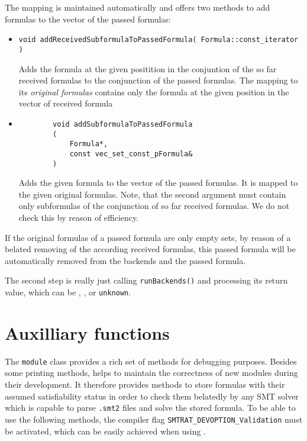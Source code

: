 The mapping is maintained automatically and offers two methods to add formulas to the vector
of the passed formulas:
\begin{itemize}
	\item \begin{verbatim}void addReceivedSubformulaToPassedFormula( Formula::const_iterator )\end{verbatim}
		Adds the formula at the given positition in the conjuntion of the so far received formulas
		to the conjunction of the passed formulas. The mapping to its \emph{original formulas} contains
		only the formula at the given position in the vector of received formula
	\item
		\begin{verbatim}
		void addSubformulaToPassedFormula
		(
		    Formula*,
		    const vec_set_const_pFormula&
		)
		\end{verbatim}
		Adds the given formula to the vector of the passed formulas. It is mapped to the given
		original formulas. Note, that the second argument must contain only subformulas of the conjunction 
		of so far received formulas. We	do not check this by reason of efficiency.
\end{itemize}
If the original formulas of a passed formula are only empty sets, by reason of a belated removing of the according
received formulas, this passed formula will be automatically removed from the backends and the passed formula.

The second step is really just calling \texttt{runBackends()} and processing its return value, which can be
\true, \false, or \texttt{unknown}.

\section{Auxilliary functions}
The \texttt{module} class provides a rich set of methods for debugging purposes. Besides some 
printing methods, \smtrat helps to maintain the correctness of new modules during their development.
It therefore provides methods to store formulas with their assumed satisfiability status in order
to check them belatedly by any SMT solver which is capable to parse \texttt{.smt2} files and solve
the stored formula. To be able to use the following methods, the compiler flag \texttt{SMTRAT\_DEVOPTION\_Validation}
must be activated, which can be easily achieved when using \ccmake.

